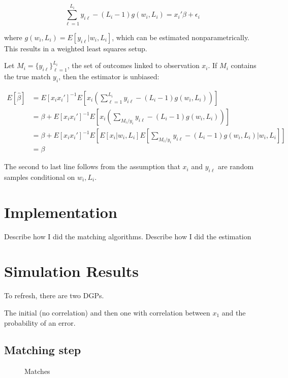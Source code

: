 \documentclass[12pt]{article}
\begin{document}
\begin{enumerate}
\begin{equation} 
\sum_{\ell=1}^{L_i} y_{i\ell} - (L_i - 1)g(w_i, L_i) = x_i'\beta + \epsilon_i \end{equation}

\noindent where $g(w_i, L_i) = E[y_{i\ell} | w_i, L_i ]$, which can be estimated nonparametrically.   This results in a weighted least squares setup.  

Let $M_i = \{y_{i\ell}\}_{\ell=1}^{L_i}$, the set of outcomes linked to observation $x_i$.  If $M_i$ contains the true match $y_i$,  then the estimator is unbiased:  

\begin{align*} E[\hat{\beta}] &= E[x_ix_i']^{-1}E\left[x_i\left( \sum_{\ell = 1}^{L_i} y_{i\ell}- (L_i-1)g(w_i,L_i) \right) \right] \\
&=\beta + E[x_ix_i']^{-1} E\left[ x_i \left(\sum_{M_i / y_i} y_{i\ell} - (L_i -1) g(w_i, L_i)\right)\right] \\ 
&= \beta +  E[x_ix_i']^{-1} E\left[ E[x_i |w_i, L_i] E\left[\sum_{M_i / y_i} y_{i\ell} - (L_i -1) g(w_i, L_i) | w_i, L_i \right] \right]  \\
&= \beta \end{align*} 

The second to last line follows from the assumption that $x_i$ and $y_{i\ell}$ are random samples conditional on $w_i, L_i$.  

\section{Implementation}

Describe how I did the matching algorithms.  Describe how I did the estimation 

\section{Simulation Results}
To refresh, there are two DGPs. 

The initial (no correlation) and then one with correlation between $x_1$ and the probability of an error. 

\subsection{Matching step}
\begin{figure}[htbp]
\caption{Matches}
\begin{center}


\label{default}
\end{center}
\end{figure}


\end{enumerate}
\end{document}

